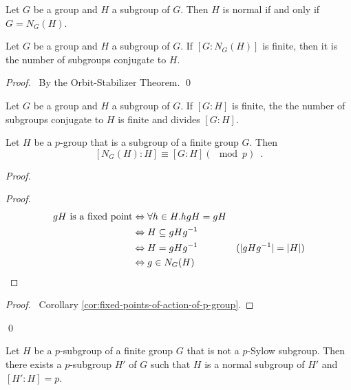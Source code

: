 \begin{cor}
\label{cor:normal-NG}
Let $G$ be a group and $H$ a subgroup of $G$. Then $H$ is normal if and only if $G = N_G(H)$.
\end{cor}

\begin{prop}
\label{prop:number-of-subgroup-conjugate-to-H}
Let $G$ be a group and $H$ a subgroup of $G$. If $[G:N_G(H)]$ is finite, then it is the number of subgroups conjugate to $H$.
\end{prop}

\begin{proof}
\pf\ By the Orbit-Stabilizer Theorem. \qed
\end{proof}

\begin{cor}
\label{cor:number-of-conjugates-divides-index}
Let $G$ be a group and $H$ a subgroup of $G$. If $[G:H]$ is finite, the the number of subgroups conjugate to $H$ is finite and divides $[G:H]$.
\end{cor}

\begin{lm}
\label{lm:index-of-H-in-NGH}
Let $H$ be a $p$-group that is a subgroup of a finite group $G$. Then
\[ [N_G(H) : H] \equiv [G:H] (\mod p) \enspace . \]
\end{lm}

\begin{proof}
\pf
{}
\begin{proof}
	\pf
	\begin{align*}
		gH \text{ is a fixed point}
		& \Leftrightarrow \forall h \in H. hgH = gH \\
		& \Leftrightarrow H \subseteq gH{g}^{-1} \\
		& \Leftrightarrow H = gH{g}^{-1} & (|gH{g}^{-1}| = |H|) \\
		& \Leftrightarrow g \in N_G(H)
	\end{align*}
\end{proof}
\qedstep
\begin{proof}
	\pf\ Corollary \ref{cor:fixed-points-of-action-of-p-group}.
\end{proof}
\qed
\end{proof}

\begin{prop}
Let $H$ be a $p$-subgroup of a finite group $G$ that is not a $p$-Sylow subgroup. Then there exists a $p$-subgroup $H'$ of $G$ such that $H$ is a normal subgroup of $H'$ and $[H':H] = p$.
\end{prop}


